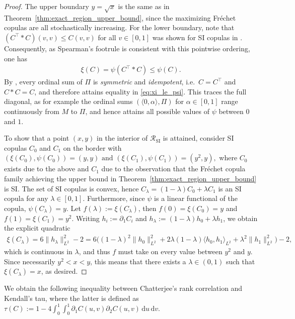 \documentclass{article}
\newcommand{\1}{\mathds{1}}
\newcommand{\de}{\mathrm{\,d}}
\newcommand{\PiC}{\Pi}         %
\newcommand{\MC}{M}            %
\begin{document}
\begin{proof}
The upper boundary $y=\sqrt{x}$ is the same as in Theorem~\ref{thm:exact_region_upper_bound}, since the maximizing Fréchet copulas are all stochastically increasing.
For the lower boundary, note that \((C^\top\ast C)(v,v) \leq C(v,v)\) for all \(v\in[0,1]\) was shown for SI copulas in \cite[Thm.~4.2]{siburg2021stochastic}.
Consequently, as Spearman's footrule is consistent with this pointwise ordering, one has
\begin{align}\label{eq:xi_le_psi}
\xi(C)
= \psi(C^\top \ast C)
\le \psi(C).
\end{align}
By \cite[Thm.~5.1]{siburg2021stochastic}, every ordinal sum of $\Pi$ is \emph{symmetric} and \emph{idempotent}, i.e.\ $C=C^\top$ and $C*C=C$, and therefore attains equality in \eqref{eq:xi_le_psi}.
This traces the full diagonal, as for example the ordinal sums $(\langle 0, \alpha\rangle, \PiC)$ for $\alpha \in [0,1]$ range continuously from $\MC$ to $\PiC$, and hence attains all possible values of $\psi$ between $0$ and $1$.

To show that a point $(x, y)$ in the interior of $\mathcal{R}_{\text{SI}}$ is attained, consider SI copulas $C_0$ and $C_1$ on the border with
\(
    (\xi(C_0), \psi(C_0)) = (y, y) \text{ and } (\xi(C_1), \psi(C_1)) = (y^2, y),
\)
where $C_0$ exists due to the above and $C_1$ due to the observation that the Fréchet copula family achieving the upper bound in Theorem~\ref{thm:exact_region_upper_bound} is SI.
The set of SI copulas is convex, hence $C_\lambda = (1-\lambda)C_0 + \lambda C_1$ is an SI copula for any $\lambda \in [0,1]$.
Furthermore, since $\psi$ is a linear functional of the copula,
\(
\psi(C_\lambda) = y.
\)
Let $f(\lambda) := \xi(C_\lambda)$, then $f(0) = \xi(C_0) = y$ and $f(1) = \xi(C_1) = y^2$.
Writing $h_i:=\partial_1 C_i$ and $h_\lambda:=(1-\lambda)h_0+\lambda h_1$, we obtain the explicit quadratic
\begin{align}\label{eq:xi_convex_continuity}
\xi(C_\lambda)=6\|h_\lambda\|_{L^2}^2-2
=6\bigl((1-\lambda)^2\|h_0\|_{L^2}^2+2\lambda(1-\lambda)\langle h_0,h_1\rangle_{L^2}+\lambda^2\|h_1\|_{L^2}^2\bigr)-2,
\end{align}
which is continuous in $\lambda$, and thus $f$ must take on every value between $y^2$ and $y$.
Since necessarily $y^2 < x < y$, this means that there exists a $\lambda \in (0,1)$ such that $\xi(C_\lambda)=x$, as desired.
\end{proof}

We obtain the following inequality between Chatterjee's rank correlation and Kendall's tau, where the latter is defined as
\(
\tau(C):= 1 - 4 \int_0^1 \int_0^1 \partial_1 C(u,v) \partial_2 C(u,v) \de u \de v.
\)
\end{document}
